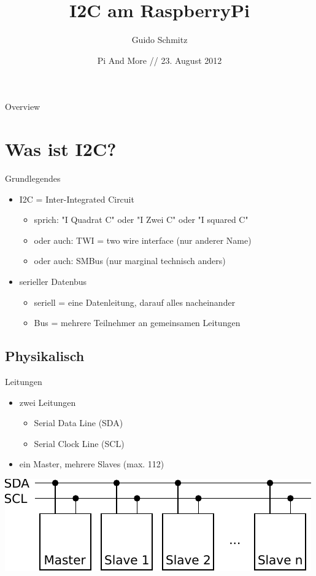 \documentclass{beamer}
\title{I2C am RaspberryPi}
\author{Guido Schmitz}
\date{Pi And More // 23. August 2012}
\begin{document}
\begin{frame}[plain]
 \titlepage
\end{frame}

\begin{frame}{Overview}
 \tableofcontents
\end{frame}


\section{Was ist I2C?}

\begin{frame}{Grundlegendes}
 \begin{itemize}
  \item I2C = Inter-Integrated Circuit
   \begin{itemize}
    \item sprich: "I Quadrat C" oder "I Zwei C" oder "I squared C"
    \item oder auch: TWI = two wire interface (nur anderer Name)
    \item oder auch: SMBus (nur marginal technisch anders)
   \end{itemize}
  \item serieller Datenbus
   \begin{itemize}
    \item seriell = eine Datenleitung, darauf alles nacheinander
    \item Bus = mehrere Teilnehmer an gemeinsamen Leitungen
   \end{itemize}
 \end{itemize}
\end{frame}

\subsection{Physikalisch}

\begin{frame}{Leitungen}
 \begin{itemize}
  \item zwei Leitungen
   \begin{itemize}
    \item Serial Data Line (SDA)
    \item Serial Clock Line (SCL)
   \end{itemize}
  \item ein Master, mehrere Slaves (max. 112)
 \end{itemize}
 \includegraphics[width=\textwidth]{bus}
\end{frame}
\end{document}
